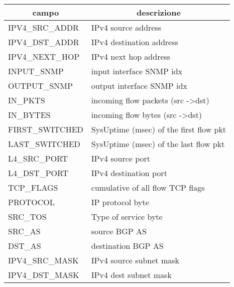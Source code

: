 \documentclass[../main.tex]{subfiles}
\begin{document}
\begin{table}[h]
\begin{tabular}{|l|l|}
\hline
\multicolumn{1}{|c|}{\textbf{campo}} & \multicolumn{1}{c|}{\textbf{descrizione}}     \\ \hline
IPV4\_SRC\_ADDR                      & IPv4 source address                           \\ \hline
IPV4\_DST\_ADDR                      & IPv4 destination address                      \\ \hline
IPV4\_NEXT\_HOP                      & IPv4 next hop address                         \\ \hline
INPUT\_SNMP                          & input interface SNMP idx                      \\ \hline
OUTPUT\_SNMP                         & output interface SNMP idx                     \\ \hline
IN\_PKTS                             & incoming flow packets (src -\textgreater dst) \\ \hline
IN\_BYTES                            & incoming flow bytes (src -\textgreater dst)   \\ \hline
FIRST\_SWITCHED                      & SysUptime (msec) of the first flow pkt        \\ \hline
LAST\_SWITCHED                       & SysUptime (msec) of the last flow pkt         \\ \hline
L4\_SRC\_PORT                        & IPv4 source port                              \\ \hline
L4\_DST\_PORT                        & IPv4 destination port                         \\ \hline
TCP\_FLAGS                           & cumulative of all flow TCP flags              \\ \hline
PROTOCOL                             & IP protocol byte                              \\ \hline
SRC\_TOS                             & Type of service byte                          \\ \hline
SRC\_AS                              & source BGP AS                                 \\ \hline
DST\_AS                              & destination BGP AS                            \\ \hline
IPV4\_SRC\_MASK                      & IPv4 source subnet mask                       \\ \hline
IPV4\_DST\_MASK                      & IPv4 dest subnet mask                         \\ \hline

\end{tabular}
\end{table}
\end{document}

